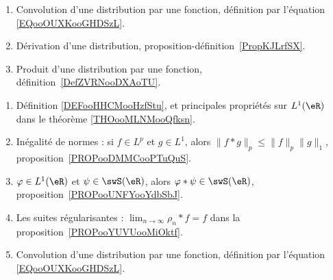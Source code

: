 \begin{enumerate}
    \item
        Convolution d'une distribution par une fonction, définition par l'équation \eqref{EQooOUXKooGHDSzL}.
    \item
        Dérivation d'une distribution, proposition-définition~\ref{PropKJLrfSX}.
    \item
        Produit d'une distribution par une fonction, définition~\ref{DefZVRNooDXAoTU}.
\end{enumerate}


\begin{enumerate}
    \item
        Définition \ref{DEFooHHCMooHzfStu}, et principales propriétés sur \( L^1(\eR)\) dans le théorème \ref{THOooMLNMooQfksn}.
    \item
        Inégalité de normes : si \( f\in L^p\) et \( g\in L^1\), alors \( \| f*g \|_p\leq \| f \|_p\| g \|_1\), proposition~\ref{PROPooDMMCooPTuQuS}.
    \item
        \( \varphi\in L^1(\eR)\) et \( \psi\in\swS(\eR)\), alors \( \varphi * \psi\in \swS(\eR)\), proposition~\ref{PROPooUNFYooYdbSbJ}.
    \item
        Les suites régularisantes : \( \lim_{n\to \infty} \rho_n*f=f\) dans la proposition~\ref{PROPooYUVUooMiOktf}.
    \item
        Convolution d'une distribution par une fonction, définition par l'équation \eqref{EQooOUXKooGHDSzL}.
\end{enumerate}

